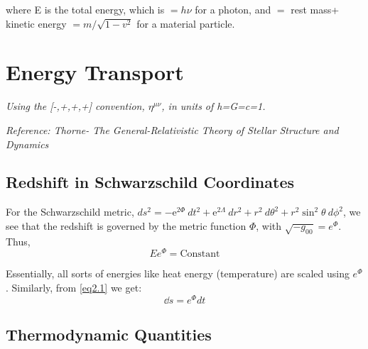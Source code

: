 \documentclass[12pt, letterpaper]{report}
\begin{document}
where E is the total energy, which is $=h\nu$ for a photon, and $=$ rest mass+ kinetic energy $=m/\sqrt{1-v^2}$ for a material particle.

\chapter{Energy Transport}

\emph{Using the [-,+,+,+] convention, $\eta^{\mu\nu}$, in units of h=G=c=1.}

\emph{Reference: Thorne- The General-Relativistic Theory of Stellar Structure and Dynamics}

\section{Redshift in Schwarzschild Coordinates}

For the Schwarzschild metric, $ds^2= -\mathrm{e}^{2\Phi}\ dt^2+ \mathrm{e}^{2\Lambda}\ dr^2+r^2\ d\theta^2+r^2\sin^2\theta\ d\phi^2$, we see that the redshift is governed by the metric function $\Phi$, with $\sqrt{-g_{00}}= e^\Phi$. Thus, $$Ee^\Phi= \text{Constant}$$

Essentially, all sorts of energies like heat energy (temperature) are scaled using $e^\Phi$. Similarly, from \cref{eq2.1} we get: $$\dd s= e^\Phi dt$$
\section{Thermodynamic Quantities}
\end{document}
